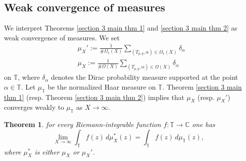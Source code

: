 \documentclass[table]{amsart}
\newtheorem{theorem}{Theorem}[section]
\numberwithin{equation}{section}
\begin{document}
\subsection{Weak convergence of measures}
We interpret Theorems \ref{section 3 main thm 1} and \ref{section 3 main thm 2} as weak convergence of measures. We set
\[
\begin{split}
&\mu_X' := \frac{1}{\#\Omega_1(X)}\sum_{(T_{p,q},\alpha)\in\Omega_1(X)} \delta_{\alpha}\\
&\mu_X := \frac{1}{\#\Omega(X)}\sum_{(T_{p,q},\alpha)\in\Omega(X)} \delta_{\alpha}
\end{split}
\]
\noindent on $\mathbb{T}$, where $\delta_{\alpha}$ denotes the Dirac probability measure supported at the point $\alpha\in \mathbb{T}$. Let $\mu_{\mathbb{T}}$ be the normalized Haar measure on $\mathbb{T}$. Theorem \ref{section 3 main thm 1} (resp. Theorem \ref{section 3 main thm 2}) implies that $\mu_X$ (resp. $\mu_X'$) converges weakly to $\mu_{\mathbb{T}}$ as $X\to\infty$. 
\begin{theorem}\label{measure theoretic convergence theorem}
for every Riemann-integrable function $f:\mathbb{T}\to\mathbb{C}$ one has
\[
\lim_{X\rightarrow \infty}\int_{\mathbb{T}}f(z)\,d\mu_X^*(z)
= \int_{\mathbb{T}} f(z)\,d\mu_{\mathbb{T}}(z),
\]
where $\mu_X^*$ is either $\mu_X$ or $\mu_X'$.
\end{theorem}
\end{document}
